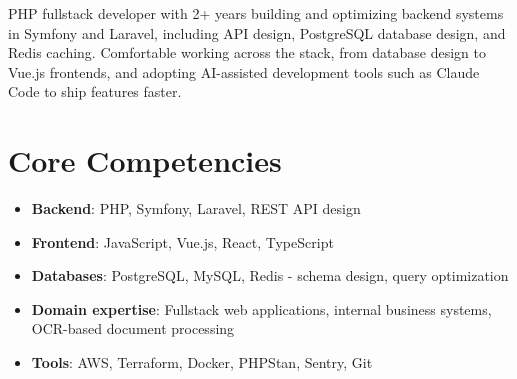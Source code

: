 \documentclass[11pt,a4paper,sans]{moderncv}
\begin{document}
\makecvtitle


\vspace{6pt}
\small{PHP fullstack developer with 2+ years building and optimizing backend systems in Symfony and Laravel, including API design, PostgreSQL database design, and Redis caching. Comfortable working across the stack, from database design to Vue.js frontends, and adopting AI-assisted development tools such as Claude Code to ship features faster.}


\section{Core Competencies}
\vspace{1pt}
\begin{itemize}

\item \textbf{Backend}: PHP, Symfony, Laravel, REST API design

\item \textbf{Frontend}: JavaScript, Vue.js, React, TypeScript

\item \textbf{Databases}: PostgreSQL, MySQL, Redis - schema design, query optimization

\item \textbf{Domain expertise}: Fullstack web applications, internal business systems, OCR-based document processing

\item \textbf{Tools}: AWS, Terraform, Docker, PHPStan, Sentry, Git

\end{itemize}

\end{document}
